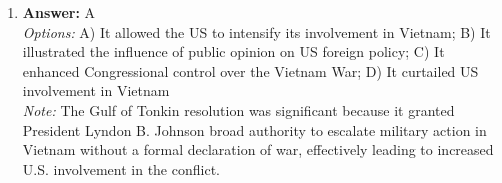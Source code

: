 \documentclass[12pt]{article}
\begin{document}
\begin{enumerate}[label=\arabic*.]
\\ \textit{Note:} The term 'New World Order' refers to the post-Cold War vision of a more integrated and cooperative global system characterized by democracy and multilateralism, primarily promoted by the United States as it sought to expand its influence and establish a framework for international relations.
\item \textbf{Answer:} A
\\ \textit{Options:} A) It allowed the US to intensify its involvement in Vietnam; B) It illustrated the influence of public opinion on US foreign policy; C) It enhanced Congressional control over the Vietnam War; D) It curtailed US involvement in Vietnam
\\ \textit{Note:} The Gulf of Tonkin resolution was significant because it granted President Lyndon B. Johnson broad authority to escalate military action in Vietnam without a formal declaration of war, effectively leading to increased U.S. involvement in the conflict.
\end{enumerate}
\end{document}
